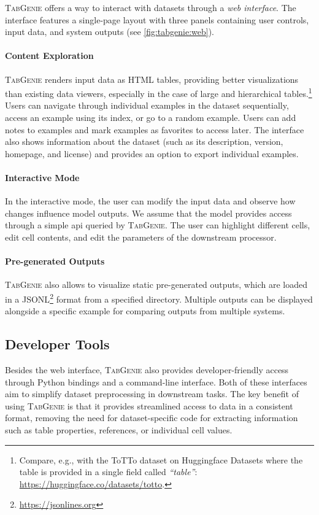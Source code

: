 \textsc{TabGenie} offers a way to interact with datasets through a \textit{web interface}. The interface features a single-page layout with three panels containing user controls, input data, and system outputs (see \autoref{fig:tabgenie:web}).

\paragraph{Content Exploration} \textsc{TabGenie} renders input data as HTML tables, providing better visualizations than existing data viewers, especially in the case of large and hierarchical tables.\footnote{Compare, e.g., with the ToTTo dataset on Huggingface Datasets where the table is provided in a single field called \textit{``table''}: \url{https://huggingface.co/datasets/totto}.} Users can navigate through individual examples in the dataset sequentially, access an example using its index, or go to a random example. Users can add notes to examples and mark examples as favorites to access later. The interface also shows information about the dataset (such as its description, version, homepage, and license) and provides an option to export individual examples.

\paragraph{Interactive Mode} In the interactive mode, the user can modify the input data and observe how changes influence model outputs. We assume that the model provides access through a simple \acs{api} queried by \textsc{TabGenie}. The user can highlight different cells, edit cell contents, and edit the parameters of the downstream processor.

\paragraph{Pre-generated Outputs} \textsc{TabGenie} also allows to visualize static pre-generated outputs, which are loaded in a JSONL\footnote{\url{https://jsonlines.org}} format from a specified directory. Multiple outputs can be displayed alongside a specific example for comparing outputs from multiple systems.


\subsection{Developer Tools}
\label{sec:tabgenie:developer}
Besides the web interface, \textsc{TabGenie} also provides developer-friendly access through Python bindings and a command-line interface. Both of these interfaces aim to simplify dataset preprocessing in downstream tasks. The key benefit of using \textsc{TabGenie} is that it provides streamlined access to data in a consistent format, removing the need for dataset-specific code for extracting information such as table properties, references, or individual cell values.



